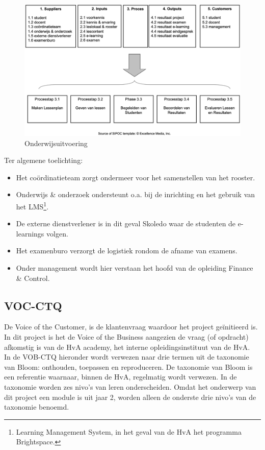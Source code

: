 \documentclass[
  a4paper,
  DIV=11,
  numbers=noendperiod]{scrartcl}
\providecommand{\tightlist}{%
  \setlength{\itemsep}{0pt}\setlength{\parskip}{0pt}}\usepackage{longtable,booktabs,array}
\begin{document}
\begin{figure}[H]

{\centering \includegraphics{./static/onderwijs_geven.jpg}

}

\caption{Onderwijsuitvoering}

\end{figure}%

Ter algemene toelichting:

\begin{itemize}
\tightlist
\item
  Het coördinatieteam zorgt ondermeer voor het samenstellen van het
  rooster.
\item
  Onderwijs \& onderzoek ondersteunt o.a. bij de inrichting en het
  gebruik van het LMS\footnote{Learning Management System, in het geval
    van de HvA het programma Brightspace.}.
\item
  De externe dienstverlener is in dit geval Skoledo waar de studenten de
  e-learnings volgen.
\item
  Het examenburo verzorgt de logistiek rondom de afname van examens.
\item
  Onder management wordt hier verstaan het hoofd van de opleiding
  Finance \& Control.
\end{itemize}

\newpage

\subsection{VOC-CTQ}\label{voc-ctq}

De Voice of the Customer, is de klantenvraag waardoor het project
geïnitieerd is. In dit project is het de Voice of the Business aangezien
de vraag (of opdracht) afkomstig is van de HvA academy, het interne
opleidingsinstituut van de HvA.\\
In de VOB-CTQ hieronder wordt verwezen naar drie termen uit de taxonomie
van Bloom: onthouden, toepassen en reproduceren. De taxonomie van Bloom
is een referentie waarnaar, binnen de HvA, regelmatig wordt verwezen. In
de taxonomie worden zes nivo's van leren onderscheiden. Omdat het
onderwerp van dit project een module is uit jaar 2, worden alleen de
onderste drie nivo's van de taxonomie benoemd.
\end{document}
